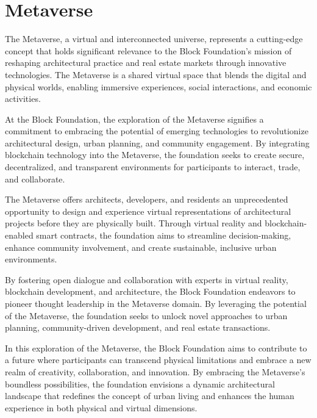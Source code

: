 \section{Metaverse}


The Metaverse, a virtual and interconnected universe, represents a cutting-edge concept that holds significant relevance to the Block Foundation's mission of reshaping architectural practice and real estate markets through innovative technologies. The Metaverse is a shared virtual space that blends the digital and physical worlds, enabling immersive experiences, social interactions, and economic activities.

At the Block Foundation, the exploration of the Metaverse signifies a commitment to embracing the potential of emerging technologies to revolutionize architectural design, urban planning, and community engagement. By integrating blockchain technology into the Metaverse, the foundation seeks to create secure, decentralized, and transparent environments for participants to interact, trade, and collaborate.

The Metaverse offers architects, developers, and residents an unprecedented opportunity to design and experience virtual representations of architectural projects before they are physically built. Through virtual reality and blockchain-enabled smart contracts, the foundation aims to streamline decision-making, enhance community involvement, and create sustainable, inclusive urban environments.

By fostering open dialogue and collaboration with experts in virtual reality, blockchain development, and architecture, the Block Foundation endeavors to pioneer thought leadership in the Metaverse domain. By leveraging the potential of the Metaverse, the foundation seeks to unlock novel approaches to urban planning, community-driven development, and real estate transactions.

In this exploration of the Metaverse, the Block Foundation aims to contribute to a future where participants can transcend physical limitations and embrace a new realm of creativity, collaboration, and innovation. By embracing the Metaverse's boundless possibilities, the foundation envisions a dynamic architectural landscape that redefines the concept of urban living and enhances the human experience in both physical and virtual dimensions.